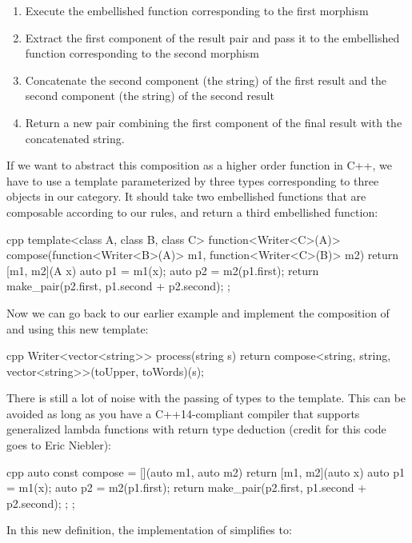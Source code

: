\begin{enumerate}
\tightlist
\item
  Execute the embellished function corresponding to the first morphism
\item
  Extract the first component of the result pair and pass it to the
  embellished function corresponding to the second morphism
\item
  Concatenate the second component (the string) of the first result
  and the second component (the string) of the second result
\item
  Return a new pair combining the first component of the final result
  with the concatenated string.
\end{enumerate}

If we want to abstract this composition as a higher order function in
C++, we have to use a template parameterized by three types
corresponding to three objects in our category. It should take two
embellished functions that are composable according to our rules, and
return a third embellished function:

\begin{snip}{cpp}
template<class A, class B, class C>
function<Writer<C>(A)> compose(function<Writer<B>(A)> m1,
                               function<Writer<C>(B)> m2)
{
    return [m1, m2](A x) {
        auto p1 = m1(x);
        auto p2 = m2(p1.first);
        return make_pair(p2.first, p1.second + p2.second); 
    };
}
\end{snip}
Now we can go back to our earlier example and implement the composition
of  and  using this new template:

\begin{snip}{cpp}
Writer<vector<string>> process(string s) { 
    return compose<string, string, vector<string>>(toUpper, toWords)(s);
}
\end{snip}
There is still a lot of noise with the passing of types to the
 template. This can be avoided as long as you have a
C++14-compliant compiler that supports generalized lambda functions with
return type deduction (credit for this code goes to Eric Niebler):

\begin{snip}{cpp}
auto const compose = [](auto m1, auto m2) { 
    return [m1, m2](auto x) { 
        auto p1 = m1(x);
        auto p2 = m2(p1.first);
        return make_pair(p2.first, p1.second + p2.second);
    };
};
\end{snip}
In this new definition, the implementation of 
simplifies to:

